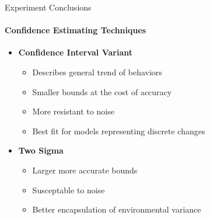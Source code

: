 \documentclass{beamer}
\begin{document}
\begin{frame}[t]{Experiment Conclusions}
  \framesubtitle{Confidence Estimating Techniques}
  \vspace*{+.25cm}

  \begin{itemize}
  \setlength\itemsep{1.25em}
    \item \textbf{Confidence Interval Variant}
      \begin{itemize}
        \item Describes general trend of behaviors
        \item Smaller bounds at the cost of accuracy
        \item More resistant to noise
        \item Best fit for models representing discrete changes
      \end{itemize}

    \item \textbf{Two Sigma}
      \begin{itemize}
        \item Larger more accurate bounds
        \item Susceptable to noise
        \item Better encapsulation of environmental variance
      \end{itemize}

  \end{itemize}
\end{frame}
\end{document}
